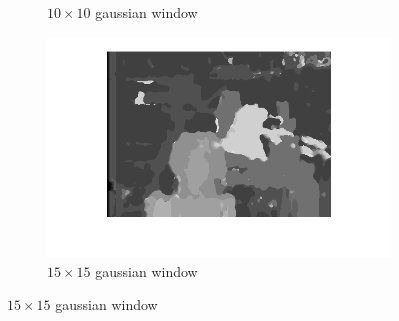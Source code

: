 \documentclass{article}
\begin{document}
\begin{figure}[ht!]
\begin{subfigure}{.3\textwidth}
  \caption{$10\times10$ gaussian window}
  \label{fig_a2}
 \end{subfigure}
 \begin{subfigure}{.3\textwidth}
  \centering
  \includegraphics[width=1\linewidth]{ex3/a15_15g.png}
  \caption{$15\times15$ gaussian window}
  \label{fig_a3} 
 \end{subfigure}
 

\end{figure}
\end{document}
